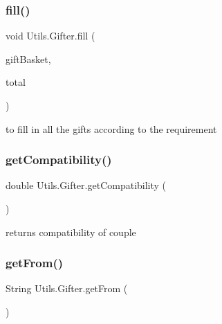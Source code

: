 \mbox{\label{class_utils_1_1_gifter_a09eb10604af7b853228c06ba4e38c62c}} 
\subsubsection{\texorpdfstring{fill()}{fill()}}
{\footnotesize\ttfamily void Utils.\+Gifter.\+fill (\begin{DoxyParamCaption}\item[{Array\+List$<$ Gift\+Basket $>$}]{gift\+Basket,  }\item[{int}]{total }\end{DoxyParamCaption})\hspace{0.3cm}{\ttfamily [inline]}}

to fill in all the gifts according to the requirement \mbox{\label{class_utils_1_1_gifter_afa636f239d83decb0f64aa20d19fc847}} 
\subsubsection{\texorpdfstring{get\+Compatibility()}{getCompatibility()}}
{\footnotesize\ttfamily double Utils.\+Gifter.\+get\+Compatibility (\begin{DoxyParamCaption}{ }\end{DoxyParamCaption})\hspace{0.3cm}{\ttfamily [inline]}}

returns compatibility of couple \mbox{\label{class_utils_1_1_gifter_a9ef6e6d57b4ab1716af2ba8cd43fdd2d}} 
\subsubsection{\texorpdfstring{get\+From()}{getFrom()}}
{\footnotesize\ttfamily String Utils.\+Gifter.\+get\+From (\begin{DoxyParamCaption}{ }\end{DoxyParamCaption})\hspace{0.3cm}{\ttfamily [inline]}}

